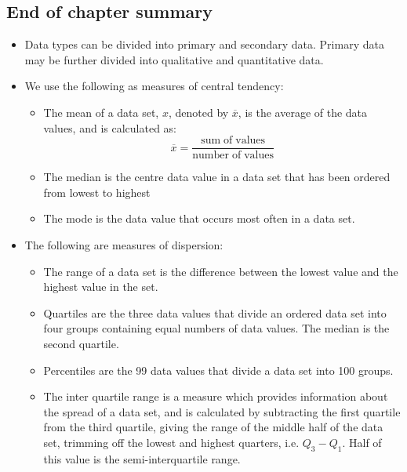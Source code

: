 \begin{description}[noitemsep]
\begin{description}[noitemsep]
            \subsection{ End of chapter summary}
            \nopagebreak
            \label{m39404*id216407}\begin{itemize}[noitemsep, label=\textbullet{}]
            \item Data types can be divided into primary and secondary data. Primary data may be further divided into qualitative and quantitative data.\label{m39404*id97322}\item We use the following as measures of central tendency:\label{m39404*id67453}\begin{itemize}[noitemsep]
            \label{m39404*uid122}\item The mean of a data set, $x$, denoted by $\overline{x}$, is the average of the data values, and is calculated as:
\label{m39404*id216451}\nopagebreak\noindent{}
    \begin{equation}
    \overline{x}=\frac{\mathrm{sum\; of\; values}}{\mathrm{number\; of\; values}}\tag{16.7}
      \end{equation}
    \label{m39404*uid123}\item The median is the centre data value in a data set that has been ordered from lowest to highest
\label{m39404*uid12454}\item The mode is the data value that occurs most often in a data set.
\end{itemize}
        \label{m39404*id973243222}\item The following are measures of dispersion:\label{m39404*id6743453453}\begin{itemize}[noitemsep]
            \label{m39404*uid12542}\item The range of a data set is the difference between the lowest value and the highest value in the set. \label{m39404*uid123543}\item Quartiles are the three data values that divide an ordered data set into four groups containing equal numbers of data values. The median is the second quartile. 
\label{m39404*uid124}\item Percentiles are the 99 data values that divide a data set into 100 groups. 
\label{m39404*uid124342}\item The inter quartile range is a measure which provides information about the spread of a data set, and is calculated by subtracting the first quartile from the third quartile, giving the range of the middle half of the data set, trimming off the lowest and highest quarters, i.e. ${Q}_{3}-{Q}_{1}$. Half of this value is the semi-interquartile range.\end{itemize}

\end{itemize}
\end{description}
\end{description}
